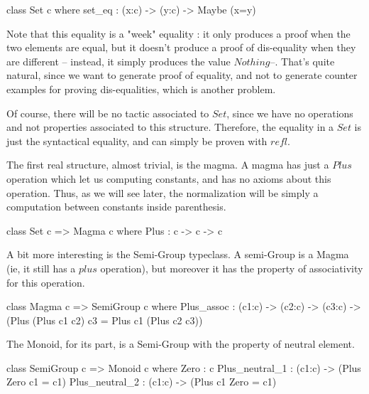 \documentclass{sigplanconf}
\begin{document}
\begin{code}[caption=Set, captionpos=b, label=lst1:haskell2]
class Set c where
    set_eq : (x:c) -> (y:c) -> Maybe (x=y)
\end{code}

Note that this equality is a "week" equality : it only produces a proof when the two elements are equal, but it doesn't produce a proof of dis-equality when they are different -- instead, it simply produces the value $Nothing$--. That's quite natural, since we want to generate proof of equality, and not to generate counter examples for proving dis-equalities, which is another problem.

Of course, there will be no tactic associated to $Set$, since we have no operations and not properties associated to this structure. Therefore, the equality in a $Set$ is just the syntactical equality, and can simply be proven with $refl$.

The first real structure, almost trivial, is the magma. A magma has just a $Plus$ operation which let us computing constants, and has no axioms about this operation. Thus, as we will see later, the normalization will be simply a computation between constants inside parenthesis.

\begin{code}[caption=Magma, captionpos=b, label=lst1:haskell2]   
class Set c => Magma c where
    Plus : c -> c -> c
\end{code}

A bit more interesting is the Semi-Group typeclass. A semi-Group is a Magma (ie, it still has a $plus$ operation), but moreover it has the property of associativity for this operation.

\begin{code}[caption=Semi-Group, captionpos=b, label=lst1:haskell2]   
class Magma c => SemiGroup c where
    Plus_assoc : (c1:c) -> (c2:c) -> (c3:c) 
           -> (Plus (Plus c1 c2) c3 
                = Plus c1 (Plus c2 c3))
\end{code}

The Monoid, for its part, is a Semi-Group with the property of neutral element.

\begin{code}[caption=Monoid, captionpos=b, label=lst1:haskell2]   
class SemiGroup c => Monoid c where
    Zero : c    
    Plus_neutral_1 : (c1:c) 
            -> (Plus Zero c1 = c1)    
    Plus_neutral_2 : (c1:c) 
             -> (Plus c1 Zero = c1)
\end{code}	
\end{document}
